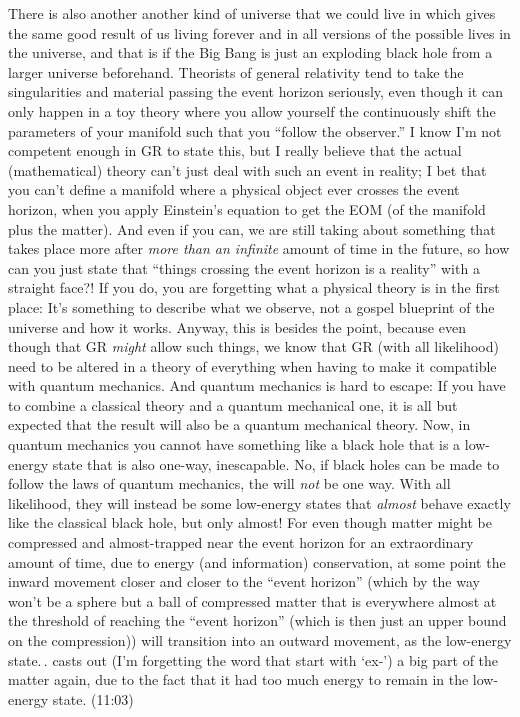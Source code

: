 \documentclass{report}
\begin{document}
There is also another another kind of universe that we could live in which gives the same good result of us living forever and in all versions of the possible lives in the universe, and that is if the Big Bang is just an exploding black hole from a larger universe beforehand. Theorists of general relativity tend to take the singularities and material passing the event horizon seriously, even though it can only happen in a toy theory where you allow yourself the continuously shift the parameters of your manifold such that you ``follow the observer.'' I know I'm not competent enough in GR to state this, but I really believe that the actual (mathematical) theory can't just deal with such an event in reality; I bet that you can't define a manifold where a physical object ever crosses the event horizon, when you apply Einstein's equation to get the EOM (of the manifold plus the matter). And even if you can, we are still taking about something that takes place more after \emph{more than an infinite} amount of time in the future, so how can you just state that ``things crossing the event horizon is a reality'' with a straight face?! If you do, you are forgetting what a physical theory is in the first place: It's something to describe what we observe, not a gospel blueprint of the universe and how it works. Anyway, this is besides the point, because even though that GR \emph{might} allow such things, we know that GR (with all likelihood) need to be altered in a theory of everything when having to make it compatible with quantum mechanics. And quantum mechanics is hard to escape: If you have to combine a classical theory and a quantum mechanical one, it is all but expected that the result will also be a quantum mechanical theory. Now, in quantum mechanics you cannot have something like a black hole that is a low-energy state that is also one-way, inescapable. No, if black holes can be made to follow the laws of quantum mechanics, the will \emph{not} be one way. With all likelihood, they will instead be some low-energy states that \emph{almost} behave exactly like the classical black hole, but only almost! For even though matter might be compressed and almost-trapped near the event horizon for an extraordinary amount of time, due to energy (and information) conservation, at some point the inward movement closer and closer to the ``event horizon'' (which by the way won't be a sphere but a ball of compressed matter that is everywhere almost at the threshold of reaching the ``event horizon'' (which is then just an upper bound on the compression)) will transition into an outward movement, as the low-energy state.\,. casts out (I'm forgetting the word that start with `ex-') a big part of the matter again, due to the fact that it had too much energy to remain in the low-energy state. (11:03)
\end{document}
